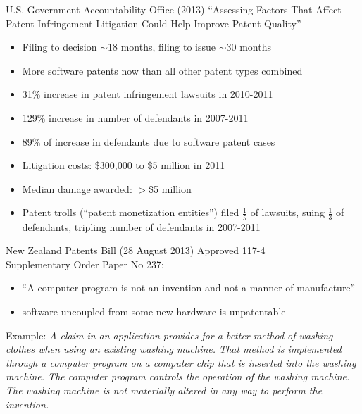 \documentclass{beamer}
\begin{document}
\begin{frame}{U.S. Government Accountability Office (2013)}
``Assessing Factors That Affect Patent Infringement Litigation Could Help Improve Patent Quality''
\begin{itemize}
\item Filing to decision $\sim$18 months, filing to issue $\sim$30 months
\item More software patents now than all other patent types combined
\item 31\% increase in patent infringement lawsuits in 2010-2011
\item 129\% increase in number of defendants in 2007-2011
\item 89\% of increase in defendants due to software patent cases
\item Litigation costs: \$300,000 to \$5 million in 2011
\item Median damage awarded: $>$\$5 million
\item Patent trolls (``patent monetization entities'') filed $\frac{1}{5}$ of lawsuits, suing $\frac{1}{3}$ of defendants, tripling number of defendants in 2007-2011
\end{itemize}
\bigskip
\centering
\href{http://www.gao.gov/assets/660/657103.pdf}{}
\end{frame}

\begin{frame}{New Zealand Patents Bill (28 August 2013)}
Approved 117-4\\
\bigskip
Supplementary Order Paper No 237:
\begin{itemize}
\item ``A computer program is not an invention and not a manner of manufacture''
\item software uncoupled from some new hardware is unpatentable
\end{itemize}
\bigskip
Example:
\textit{A claim in an application provides for a better method of washing clothes when using an existing washing machine. That method is implemented through a computer program on a computer chip that is inserted into the washing machine. The computer program controls the operation of the washing machine. The washing machine is not materially altered in any way to perform the invention.} \\
\bigskip
\centering
\href{http://www.legislation.govt.nz/sop/government/2013/0237/latest/whole.html}{}
\end{frame}
\end{document}
